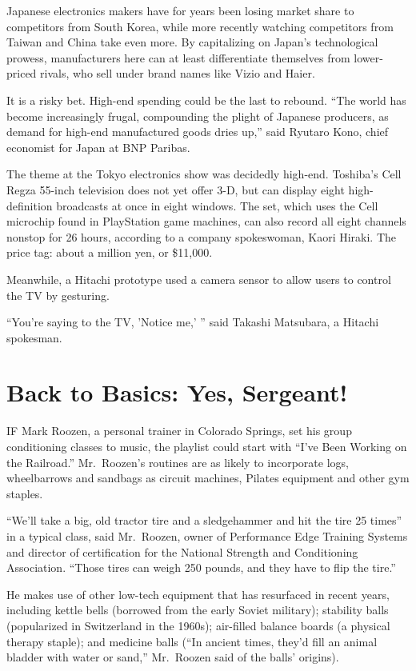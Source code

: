 ﻿\documentclass[12pt]{article}
\begin{document}
Japanese electronics makers have for years been losing market share to competitors from South Korea,
while more recently watching competitors from Taiwan and China take even more. By capitalizing on
Japan's technological prowess, manufacturers here can at least differentiate themselves from
lower-priced rivals, who sell under brand names like Vizio and Haier.

It is a risky bet. High-end spending could be the last to rebound. ``The world has become
increasingly frugal, compounding the plight of Japanese producers, as demand for high-end
manufactured goods dries up,'' said Ryutaro Kono, chief economist for Japan at BNP Paribas.

The theme at the Tokyo electronics show was decidedly high-end. Toshiba's Cell Regza 55-inch
television does not yet offer 3-D, but can display eight high-definition broadcasts at once in eight
windows. The set, which uses the Cell microchip found in PlayStation game machines, can also record
all eight channels nonstop for 26 hours, according to a company spokeswoman, Kaori Hiraki. The price
tag: about a million yen, or \$11,000.

Meanwhile, a Hitachi prototype used a camera sensor to allow users to control the TV by gesturing.

``You're saying to the TV, 'Notice me,' '' said Takashi Matsubara, a Hitachi spokesman.

\section{Back to Basics: Yes, Sergeant!}

\lettrine{I}{F} Mark Roozen, a personal trainer in Colorado Springs, set his
group conditioning classes to music, the playlist could start with ``I've Been Working on the
Railroad.'' Mr.~Roozen's routines are as likely to incorporate logs, wheelbarrows and sandbags as
circuit machines, Pilates equipment and other gym staples.

``We'll take a big, old tractor tire and a sledgehammer and hit the tire 25 times'' in a typical
class, said Mr.~Roozen, owner of Performance Edge Training Systems and director of certification for
the National Strength and Conditioning Association. ``Those tires can weigh 250 pounds, and they
have to flip the tire.''

He makes use of other low-tech equipment that has resurfaced in recent years, including kettle bells
(borrowed from the early Soviet military); stability balls (popularized in Switzerland in the
1960s); air-filled balance boards (a physical therapy staple); and medicine balls (``In ancient
times, they'd fill an animal bladder with water or sand,'' Mr.~Roozen said of the balls' origins).
\end{document}
